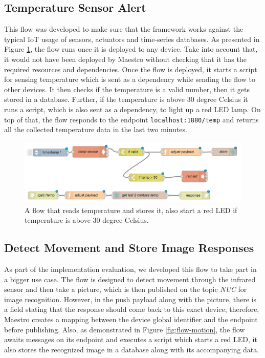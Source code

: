 \subsection{Temperature Sensor Alert}\label{susbec:temp}
This flow was developed to make sure that the  framework works against the typical IoT usage of sensors, actuators and time-series databases. As presented in Figure \ref{fig:flow-temp}, the flow runs once it is deployed to any device. Take into account that, it would not have been deployed by Maestro without checking that it has the required resources and dependencies. Once the flow is deployed, it starts a script for sensing temperature  which is sent as a dependency while sending the flow to other devices. It then checks if the temperature is a valid number, then it gets stored in a database. Further, if the temperature is above 30 degree Celsius it runs a script, which is also sent as a dependency, to light up a red LED lamp. On top of that, the flow responds to the endpoint \verb|localhost:1880/temp| and returns all the collected temperature data in the last two minutes.
 \begin{figure}[H]
	\centering
	\includegraphics[scale=0.6]{images/flow-temp.png}
	\caption{A flow that reads temperature and stores it, also start a red LED if temperature is above 30 degree Celsius.}
	\label{fig:flow-temp}
\end{figure}



\subsection{Detect Movement and Store Image Responses} \label{subsec:detect-move}
As part of the implementation evaluation, we developed this flow to take part in a bigger use case. The flow is designed to detect movement through the infrared sensor and then take a picture, which is then published on the topic \textit{NUC} for image recognition. However, in the push payload along with the picture, there is a field stating that the response should come back to this exact device, therefore, Maestro creates a mapping between the device global identifier and the endpoint before publishing. Also, as demonstrated in Figure \ref{fig:flow-motion}, the flow awaits messages on its endpoint and executes a script which starts a red LED, it also stores the recognized image in a database along with its accompanying data. 

